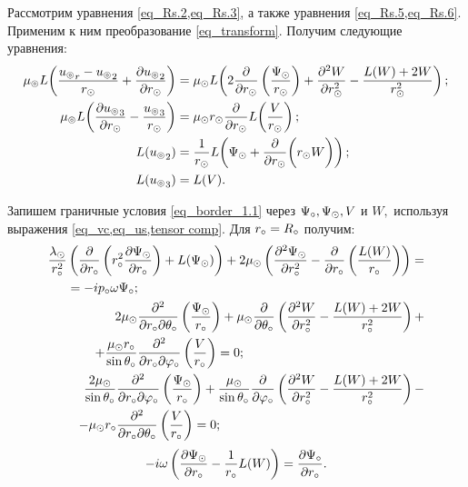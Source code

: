 Рассмотрим уравнения \cref{eq_Rs.2,eq_Rs.3}, а также уравнения \cref{eq_Rs.5,eq_Rs.6}. Применим к ним преобразование \cref{eq_transform}. Получим следующие уравнения:
\begin{align}
\mu_\circledcirc L\!\left(\frac{{u_\circledcirc}_r-{u_\circledcirc}_2}{r_\odot} + \frac{\partial {u_\circledcirc}_2}{\partial r_\odot}\right) &= \mu_\odot L\!\left(2\frac{\partial}{\partial r_\odot}\left(\frac{\Psi_\odot}{r_\odot}\right)+  \frac{\partial^2 W}{\partial r_\odot^2} - \frac{L(W) + 2W}{r_\odot^2} \right);\label{eq_Rs.2.2}\\
\mu_\circledcirc L\!\left(\frac{\partial {u_\circledcirc}_3}{\partial r_\odot} - \frac{{u_\circledcirc}_3}{r_\odot}\right) &= \mu_\odot r_\odot\frac{\partial}{\partial r_\odot}L\!\left(\frac{V}{r_\odot}\right);\label{eq_Rs.3.2}\\
L({u_\circledcirc}_2) &= \frac{1}{r_\odot}L\!\left(\Psi_\odot + \frac{\partial}{\partial r_\odot}\biggl(r_\odot W\biggr)\right);\label{eq_Rs.5.2}\\
L({u_\circledcirc}_3) &= L(V).\label{eq_Rs.6.2}
\end{align}

Запишем граничные условия \cref{eq_border_1.1} через $\Psi_\circ, \Psi_\odot, V$ и $W,$ используя выражения \cref{eq_vc,eq_us,tensor comp}. Для $r_\circ=R_\circ$ получим:
\begin{align}
\begin{split}
\frac{\lambda_\odot}{r_\circ^2}&\left(\frac{\partial}{\partial r_\circ}\left(r_\circ^2\frac{\partial\Psi_\odot}{\partial r_\circ}\right)+L(\Psi_\odot)\right) + 2\mu_\odot\left(\frac{\partial^2 \Psi_\odot}{\partial r_\circ^2} - \frac{\partial}{\partial r_\circ}\left(\frac{L(W)}{r_\circ}\right)\right) = \\
& = - ip_\circ\omega\Psi_\circ;
\end{split}\label{eq_Rc.1}\\
\begin{split}
2\mu_\odot&\frac{\partial^2}{\partial r_\circ\partial\theta_\circ}\left(\frac{\Psi_\odot}{r_\circ}\right)+ \mu_\odot\frac{\partial}{\partial\theta_\circ}\left(\frac{\partial^2 W}{\partial r_\circ^2} - \frac{L(W) + 2W}{r_\circ^2}\right) + \\
+ \frac{\mu_\odot r_\circ}{\sin\theta_\circ}&\frac{\partial^2}{\partial r_\circ\partial\varphi_\circ}\left(\frac{V}{r_\circ}\right) = 0;
\end{split}\label{eq_Rc.2}\\
\begin{split}
\frac{2\mu_\odot}{\sin\theta_\circ}&\frac{\partial^2}{\partial r_\circ\partial\varphi_\circ}\left(\frac{\Psi_\odot}{r_\circ}\right)+ \frac{\mu_\odot}{\sin\theta_\circ}\frac{\partial}{\partial\varphi_\circ}\left(\frac{\partial^2 W}{\partial r_\circ^2} - \frac{L(W) + 2W}{r_\circ^2}\right) - \\
- \mu_\odot r_\circ&\frac{\partial^2}{\partial r_\circ\partial\theta_\circ}\left(\frac{V}{r_\circ}\right) = 0;
\end{split}\label{eq_Rc.3}
\end{align}
\begin{equation}\label{eq_Rc.4}
-i\omega \left(\frac{\partial \Psi_\odot}{\partial r_\circ} - \frac{1}{r_\circ}L(W)\right) = \frac{\partial \Psi_\circ}{\partial r_\circ}.
\end{equation}

